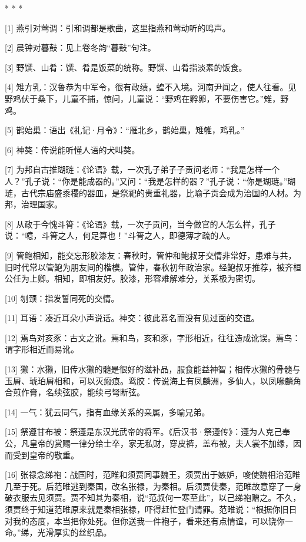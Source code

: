 \documentclass[12pt,UTF8]{ctexbook}
\begin{document}
* * *



[1] 燕引对莺调：引和调都是歌曲，这里指燕和莺动听的鸣声。

[2] 晨钟对暮鼓：见上卷冬韵“暮鼓”句注。

[3] 野馔、山肴：馔、肴是饭菜的统称。野馔、山肴指淡素的饭食。

[4] 雉方乳：汉鲁恭为中军令，很有政绩，蝗不入境。河南尹闻之，使人往看。见野鸡伏于桑下，儿童不捕，惊问，儿童说：“野鸡在孵卵，不要伤害它。”雉，野鸡。

[5] 鹊始巢：语出《礼记·月令》：“雁北乡，鹊始巢，雉雊，鸡乳。”

[6] 神獒：传说能听懂人语的犬叫獒。

[7] 为邦自古推瑚琏：《论语》载，一次孔子弟子子贡问老师：“我是怎样一个人？”孔子说：“你是能成器的。”又问：“我是怎样的器？”孔子说：“你是瑚琏。”瑚琏，古代宗庙盛黍稷的器皿，是祭祀的贵重礼器，比喻子贡会成为治国的人材。为邦，治理国家。

[8] 从政于今愧斗筲：《论语》载，一次子贡问，当今做官的人怎么样，孔子说：“噫，斗筲之人，何足算也！”斗筲之人，即德薄才疏的人。

[9] 管鲍相知，能交忘形胶漆友：春秋时，管仲和鲍叔牙交情非常好，患难与共，旧时代常以管鲍为朋友间的楷模。管仲，春秋初年政治家。经鲍叔牙推荐，被齐桓公任为上卿。相知，即相友好。胶漆，形容难解难分，关系极为密切。

[10] 刎颈：指发誓同死的交情。

[11] 耳语：凑近耳朵小声说话。神交：彼此慕名而没有见过面的交谊。

[12] 焉鸟对亥豕：古文之讹。焉和鸟，亥和豕，字形相近，往往造成讹误。焉鸟：谓字形相近而易讹。

[13] 獭：水獭，旧传水獭的髓是很好的滋补品，服食能益神智；相传水獭的骨髓与玉屑、琥珀屑相和，可以灭瘢痕。鸾胶：传说海上有凤麟洲，多仙人，以凤喙麟角合煎作膏，名续弦胶，能续弓弩断弦。

[14] 一气：犹云同气，指有血缘关系的亲属，多喻兄弟。

[15] 祭遵甘布被：祭遵是东汉光武帝的将军。《后汉书·祭遵传》：遵为人克己奉公，凡皇帝的赏赐一律分给士卒，家无私财，穿皮裤，盖布被，夫人裳不加缘，因而受到皇帝的敬重。

[16] 张禄念绨袍：战国时，范睢和须贾同事魏王，须贾出于嫉妒，唆使魏相治范睢几至于死。后范睢逃到秦国，改名张禄，为秦相。后须贾使秦，范睢故意穿了一身破衣服去见须贾。贾不知其为秦相，说“范叔何一寒至此”，以己绨袍赠之。不久，须贾终于知道范睢原来就是秦相张禄，吓得赶忙登门请罪。范睢说：“根据你旧日对我的态度，本当把你处死。但你送我一件袍子，看来还有点情谊，可以饶你一命。”绨，光滑厚实的丝织品。
\end{document}
